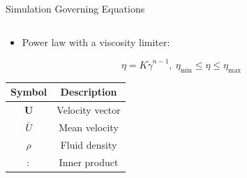 \begin{frame}{\openfoam Simulation Governing Equations}
\begin{columns}
\begin{column}{.5\textwidth}
\begin{itemize}
\item Power law with a viscosity limiter:
\end{itemize}
\begin{equation*}
\eta = K\dot{\gamma}^{n-1},\ \eta_{\text{min}} \leq \eta \leq \eta_{\text{max}}
\end{equation*}

\def\arraystretch{1.2}%
\begin{table}
\begin{tabular}{ c | c }
Symbol & Description \\
\hline \hline
$\boldsymbol{U}$ & Velocity vector\\
$\bar{U}$ & Mean velocity\\
$\rho$ & Fluid density\\
$:$ & Inner product
\end{tabular}
\end{table}
\end{column}
\end{columns}

\end{frame}


